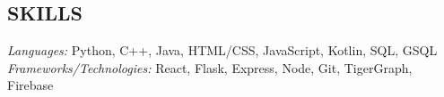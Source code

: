\documentclass[11pt]{res}
\begin{document}
\begin{footnotesize}
\begin{resume}
\begin{small}
\section{SKILLS}
\end{small} 
\vspace{.5mm}
{\sl Languages:} 
Python, C++, Java, HTML/CSS, JavaScript, Kotlin, SQL, GSQL \\
{\sl Frameworks/Technologies:} React, Flask, Express, Node, Git, TigerGraph, Firebase

\end{resume}
\end{footnotesize}
\end{document}
